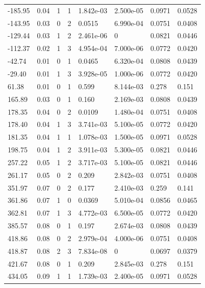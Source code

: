 \documentclass[preview]{standalone}
\begin{document}
{{\begin{tabular}{L{1.2cm}C{1.2cm} C{0.3cm}C{0.5cm} C{1.4cm}C{1.4cm} C{1.4cm}C{1.4cm}}
  -185.95  &  0.04  & 1     &  1 &  1.842e-03  & 2.500e-05  & 0.0971 &  0.0528   \\ 
  -143.95  &  0.03  & 0     &  2 &  0.0515  & 6.990e-04  & 0.0751 &  0.0408   \\ 
  -129.44  &  0.03  & 1     &  2 &  2.461e-06  & 0  & 0.0821 &  0.0446   \\ 
  -112.37  &  0.02  & 1     &  3 &  4.954e-04  & 7.000e-06  & 0.0772 &  0.0420   \\ 
  -42.74  &  0.01  & 0     &  1 &  0.0465  & 6.320e-04  & 0.0808 &  0.0439   \\ 
  -29.40  &  0.01  & 1     &  3 &  3.928e-05  & 1.000e-06  & 0.0772 &  0.0420   \\ 
  61.38  &  0.01  & 0     &  1 &  0.599  & 8.144e-03  & 0.278 &  0.151   \\ 
  165.89  &  0.03  & 0     &  1 &  0.160  & 2.169e-03  & 0.0808 &  0.0439   \\ 
  178.35  &  0.04  & 0     &  2 &  0.0109  & 1.480e-04  & 0.0751 &  0.0408   \\ 
  178.40  &  0.04  & 1     &  3 &  3.741e-03  & 5.100e-05  & 0.0772 &  0.0420   \\ 
  181.35  &  0.04  & 1     &  1 &  1.078e-03  & 1.500e-05  & 0.0971 &  0.0528   \\ 
  198.75  &  0.04  & 1     &  2 &  3.911e-03  & 5.300e-05  & 0.0821 &  0.0446   \\ 
  257.22  &  0.05  & 1     &  2 &  3.717e-03  & 5.100e-05  & 0.0821 &  0.0446   \\ 
  261.17  &  0.05  & 0     &  2 &  0.209  & 2.842e-03  & 0.0751 &  0.0408   \\ 
  351.97  &  0.07  & 0     &  2 &  0.177  & 2.410e-03  & 0.259 &  0.141   \\ 
  361.86  &  0.07  & 1     &  0 &  0.0369  & 5.010e-04  & 0.0856 &  0.0465   \\ 
  362.81  &  0.07  & 1     &  3 &  4.772e-03  & 6.500e-05  & 0.0772 &  0.0420   \\ 
  385.57  &  0.08  & 0     &  1 &  0.197  & 2.674e-03  & 0.0808 &  0.0439   \\ 
  418.86  &  0.08  & 0     &  2 &  2.979e-04  & 4.000e-06  & 0.0751 &  0.0408   \\ 
  418.87  &  0.08  & 2     &  3 &  7.834e-08  & 0  & 0.0697 &  0.0379   \\ 
  421.67  &  0.08  & 0     &  1 &  0.209  & 2.845e-03  & 0.278 &  0.151   \\ 
  434.05  &  0.09  & 1     &  1 &  1.739e-03  & 2.400e-05  & 0.0971 &  0.0528   \\ 

\end{tabular}}}
\end{document}
